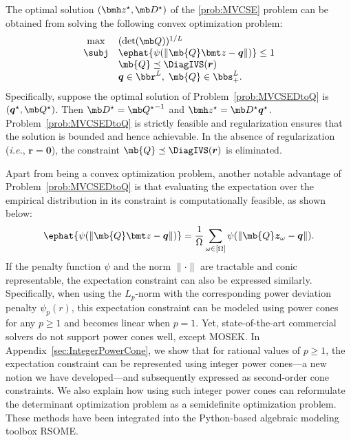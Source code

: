 \documentclass[mnsc, nonblindrev]{informswp}
\newcommand{\1}[1]{\mathds{1}{\left(#1\right)}}
\begin{document}
\begin{theorem}
\label{chap8:thm:MinimumVolumeDtoQ}
The optimal solution $(\bmh z^\star, \mb D^\star)$ of the \ref{prob:MVCSE} problem can be obtained from solving the following convex optimization problem:
\begin{equation}
\label{prob:MVCSEDtoQ}
\begin{array}{cll}
\max & (\det(\mb Q))^{1/L} \\
\subj & \ephat{\psi(\|\mb{Q} \bmt z - \bm q \|)} \leq 1 \\
& \mb{Q} \preceq \DiagIVS(\bm r) \\
& \bm q \in \bbr^L, \; \mb{Q} \in \bbs^{L}_{+}.  
\end{array} 
\end{equation}
Specifically, suppose the optimal solution of Problem~\eqref{prob:MVCSEDtoQ} is $(\bm q^\star,\mb Q^\star)$. Then $\mb D^\star = {\mb Q^\star}^{-1}$ and $\bmh z^\star = \mb D^\star \bm q^\star$. Problem~\eqref{prob:MVCSEDtoQ} is strictly feasible and regularization ensures that the solution is bounded and hence achievable. In the absence of regularization (\textit{i.e.}, $\bm r =\bm 0$), the constraint $\mb{Q} \preceq \DiagIVS(\bm r)$ is eliminated.    
\end{theorem}

Apart from being a convex optimization problem, another notable advantage of Problem~\eqref{prob:MVCSEDtoQ} is that evaluating the expectation over the empirical distribution in its constraint is computationally feasible, as shown below:
$$
\ephat{\psi(\|\mb{Q} \bmt z - \bm q \|)} = \frac{1}{\Omega} \sum_{\omega \in [\Omega]} \psi(\|\mb{Q} \bm z_\omega - \bm q \|). 
$$
If the penalty function $\psi$ and the norm $\|\cdot\|$ are tractable and conic representable, the expectation constraint can also be expressed similarly. Specifically, when using the $L_p$-norm with the corresponding power deviation penalty $\psi_p(r)$, this expectation constraint can be modeled using power cones for any $p \geq 1$ and becomes linear when $p = 1$. Yet, state-of-the-art commercial solvers do not support power cones well, except MOSEK. In Appendix~\ref{sec:IntegerPowerCone}, we show that for rational values of \(p \geq 1\), the expectation constraint can be represented using integer power cones---a new notion we have developed---and subsequently expressed as second-order cone constraints. We also explain how using such integer power cones can reformulate the determinant optimization problem as a semidefinite optimization problem. These methods have been integrated into the Python-based algebraic modeling toolbox RSOME.
\end{document}
